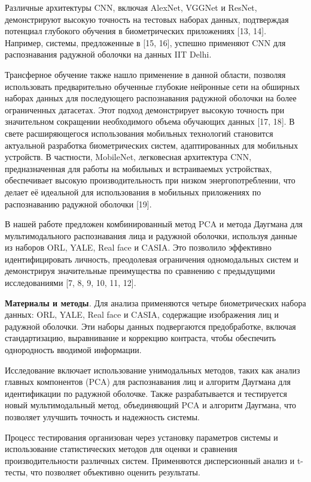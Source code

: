 Различные архитектуры CNN, включая AlexNet, VGGNet и ResNet,
демонстрируют высокую точность на тестовых наборах данных, подтверждая
потенциал глубокого обучения в биометрических приложениях {[}13, 14{]}.
Например, системы, предложенные в {[}15, 16{]}, успешно применяют CNN
для распознавания радужной оболочки на данных IIT Delhi.

Трансферное обучение также нашло применение в данной области, позволяя
использовать предварительно обученные глубокие нейронные сети на
обширных наборах данных для последующего распознавания радужной оболочки
на более ограниченных датасетах. Этот подход демонстрирует высокую
точность при значительном сокращении необходимого объема обучающих
данных {[}17, 18{]}. В свете расширяющегося использования мобильных
технологий становится актуальной разработка биометрических систем,
адаптированных для мобильных устройств. В частности, MobileNet,
легковесная архитектура CNN, предназначенная для работы на мобильных и
встраиваемых устройствах, обеспечивает высокую производительность при
низком энергопотреблении, что делает её идеальной для использования в
мобильных приложениях по распознаванию радужной оболочки {[}19{]}.

В нашей работе предложен комбинированный метод PCA и метода Даугмана для
мультимодального распознавания лица и радужной оболочки, используя
данные из наборов ORL, YALE, Real face и CASIA. Это позволило эффективно
идентифицировать личность, преодолевая ограничения одномодальных систем
и демонстрируя значительные преимущества по сравнению с предыдущими
исследованиями {[}7, 8, 9, 10, 11, 12{]}.

\textbf{Материалы и методы}\emph{.} Для анализа применяются четыре
биометрических набора данных: ORL, YALE, Real face и CASIA, содержащие
изображения лиц и радужной оболочки. Эти наборы данных подвергаются
предобработке, включая стандартизацию, выравнивание и коррекцию
контраста, чтобы обеспечить однородность вводимой информации.

Исследование включает использование унимодальных методов, таких как
анализ главных компонентов (PCA) для распознавания лиц и алгоритм
Даугмана для идентификации по радужной оболочке. Также разрабатывается и
тестируется новый мультимодальный метод, объединяющий PCA и алгоритм
Даугмана, что позволяет улучшить точность и надежность системы.

Процесс тестирования организован через установку параметров системы и
использование статистических методов для оценки и сравнения
производительности различных систем. Применяются дисперсионный анализ и
t-тесты, что позволяет объективно оценить результаты.

